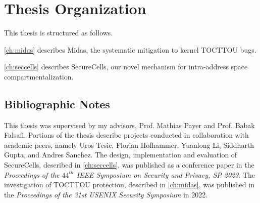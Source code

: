 
\section{Thesis Organization}
This thesis is structured as follows.

\autoref{ch:midas} describes Midas, the systematic mitigation to
kernel TOCTTOU bugs.

\autoref{ch:seccells} describes SecureCells, our novel mechanism for
intra-address space compartmentalization.

\subsection{Bibliographic Notes}
This thesis was supervised by my advisors, Prof. Mathias Payer and Prof. Babak Falsafi.
Portions of the thesis describe projects conducted in collaboration with academic peers, 
namely Uros Tesic, Florian Hofhammer, Yuanlong Li, Siddharth Gupta, and Andres Sanchez.
The design, implementation and evaluation of SecureCells, described in 
\autoref{ch:seccells}, was published as a conference paper in the 
\emph{Proceedings of the $44^{th}$ IEEE Symposium on Security and Privacy, SP 2023}.
The investigation of TOCTTOU protection, described in \autoref{ch:midas},
was published in the
\emph{Proceedings of the 31st USENIX Security Symposium} in 2022.

